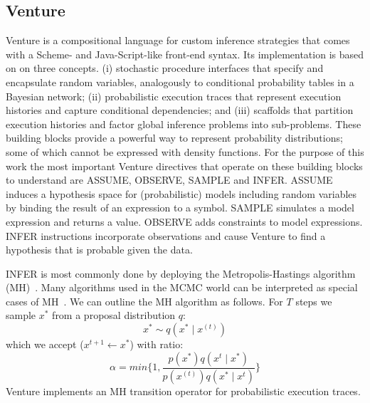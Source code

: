 \documentclass{article} %
\begin{document}
\subsection{Venture}
Venture is a compositional language for custom inference strategies that comes with a Scheme- and Java-Script-like front-end syntax. Its implementation is based on on three concepts. (i) stochastic procedure interfaces that specify and encapsulate random variables, analogously to conditional probability tables in a Bayesian network; (ii) probabilistic execution traces that represent execution histories and capture conditional dependencies; and (iii) scaffolds that partition execution histories and factor global inference problems into sub-problems. These building blocks provide a powerful way to represent probability distributions; some of which cannot be expressed with density functions. For the purpose of this work the most important Venture directives that operate on these building blocks to understand are ASSUME, OBSERVE, SAMPLE and INFER. ASSUME induces a hypothesis space for (probabilistic) models including random variables by binding the result of an expression to a symbol. SAMPLE simulates a model expression and returns a value. OBSERVE adds constraints to model expressions. INFER instructions incorporate observations and cause Venture to find a hypothesis that is probable given the data. 

INFER is most commonly done by deploying the Metropolis-Hastings algorithm (MH)~\citep{metropolis1953equation}.  Many algorithms used in the MCMC world can be interpreted as special cases of MH~\citep{andrieu2003introduction}. We can outline the MH algorithm as follows. For $T$ steps we sample $x^*$ from a proposal distribution $q$:
\begin{equation}
 x^* \sim q(x^* \mid x^{(t)})
\end{equation}
which we accept ($x^{t+1} \leftarrow x ^*$) with ratio:
\begin{equation}
\alpha = min \bigg\{1,\frac{p(x^*) q(x^{t}\mid x^*)}{p(x^{(t)}) q(x^* \mid x^{t})} \bigg\}  
\end{equation}
Venture implements an MH transition operator for probabilistic execution traces.
\end{document}
